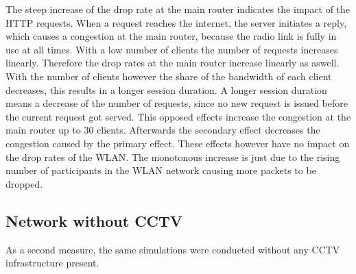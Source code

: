 \documentclass[
10pt, %
a4paper, %
oneside, %
headinclude,footinclude, %
BCOR5mm, %
]{scrartcl}
\begin{document}
The steep increase of the drop rate at the main router indicates the impact of the HTTP requests. When a request reaches the internet, the server initiates a reply, which causes a congestion at the main router, because the radio link is fully in use at all times. With a low number of clients the number of requests increases linearly. Therefore the drop rates at the main router increase linearly as aswell. With the number of clients however the share of the bandwidth of each client decreases, this results in a longer session duration. A longer session duration means a decrease of the number of requests, since no new request is issued before the current request got served. This opposed effects increase the congestion at the main router up to 30 clients. Afterwards the secondary effect decreases the congestion caused by the primary effect.
These effects however have no impact on the drop rates of the WLAN. The monotonous increase is just due to the rising number of participants in the WLAN network causing more packets to be dropped.

\subsection{Network without CCTV}
As a second measure, the same simulations were conducted without any CCTV infrastructure present.
\end{document}
